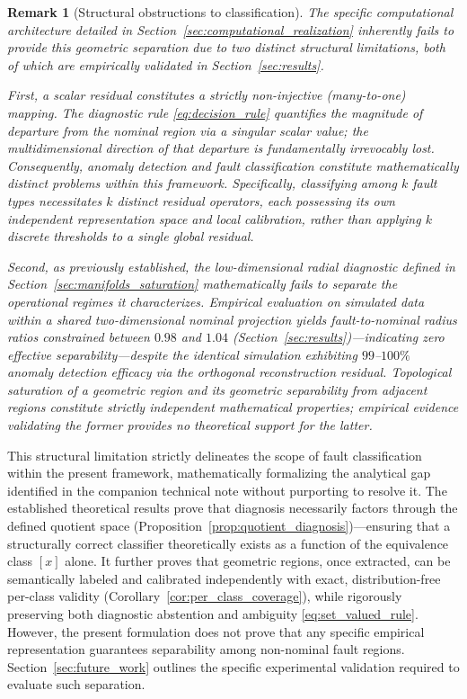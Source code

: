 \documentclass[a4paper]{cas-sc}
\newtheorem{remark}{Remark}
\begin{document}
\begin{remark}[Structural obstructions to classification]
\label{rem:classification_obstructions}
The specific computational architecture detailed in Section~\ref{sec:computational_realization} inherently fails to provide this geometric separation due to two distinct structural limitations, both of which are empirically validated in Section~\ref{sec:results}.

First, a scalar residual constitutes a strictly non-injective (many-to-one) mapping. The diagnostic rule \eqref{eq:decision_rule} quantifies the magnitude of departure from the nominal region via a singular scalar value; the multidimensional \emph{direction} of that departure is fundamentally irrevocably lost. Consequently, anomaly detection and fault classification constitute mathematically distinct problems within this framework. Specifically, classifying among \(k\) fault types necessitates \(k\) distinct residual operators, each possessing its own independent representation space and local calibration, rather than applying \(k\) discrete thresholds to a single global residual.

Second, as previously established, the low-dimensional radial diagnostic defined in Section~\ref{sec:manifolds_saturation} mathematically fails to separate the operational regimes it characterizes. Empirical evaluation on simulated data within a shared two-dimensional nominal projection yields fault-to-nominal radius ratios constrained between \(0.98\) and \(1.04\) (Section~\ref{sec:results})---indicating zero effective separability---despite the identical simulation exhibiting \(99\)--\(100\%\) anomaly detection efficacy via the orthogonal reconstruction residual. Topological saturation of a geometric region and its geometric separability from adjacent regions constitute strictly independent mathematical properties; empirical evidence validating the former provides no theoretical support for the latter.
\end{remark}

This structural limitation strictly delineates the scope of fault classification within the present framework, mathematically formalizing the analytical gap identified in the companion technical note \citep{disanti2026quotient} without purporting to resolve it. The established theoretical results prove that diagnosis necessarily factors through the defined quotient space (Proposition~\ref{prop:quotient_diagnosis})---ensuring that a structurally correct classifier theoretically exists as a function of the equivalence class \([x]\) alone. It further proves that geometric regions, once extracted, can be semantically labeled and calibrated independently with exact, distribution-free per-class validity (Corollary~\ref{cor:per_class_coverage}), while rigorously preserving both diagnostic abstention and ambiguity \eqref{eq:set_valued_rule}. However, the present formulation does not prove that any specific empirical representation guarantees separability among non-nominal fault regions. Section~\ref{sec:future_work} outlines the specific experimental validation required to evaluate such separation.
\end{document}
